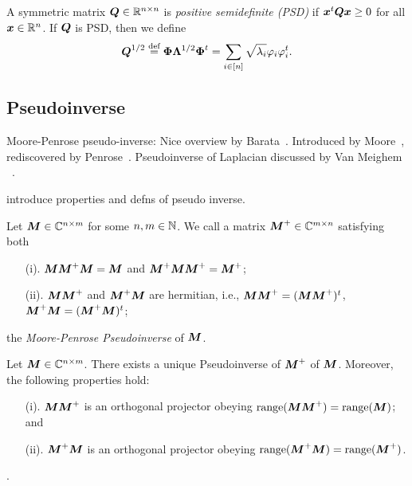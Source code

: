 A symmetric matrix $\vb*{Q}\in\mathbb{R}^{n\times n}$ is \emph{positive semidefinite (PSD)} if $\vb*{x}^t\vb*{{Q}}\vb*{x} \geq 0$ for all $\vb*{x}\in\mathbb{R}^n$. If $\vb*{{Q}}$ is PSD, then we define 
\begin{equation*}
    \vb*{{Q}}^{1/2} \overset{\text{def}}{=} \boldsymbol{\Phi}\vb{\Lambda}^{1/2}\boldsymbol{\Phi}^t = \sum_{i\in[n]}\sqrt{\lambda_i}\varphi_i\varphi_i^t.
\end{equation*}

\subsection{Pseudoinverse}
Moore-Penrose pseudo-inverse: Nice overview by Barata~\cite{barata2012moore}. Introduced by Moore~\cite{moore1920reciprocal}, rediscovered by Penrose~\cite{penrose1955generalized,penrose1956best}. Pseudoinverse of Laplacian discussed by Van Meighem \etal~\cite{van2017pseudoinverse}. 

\TODO introduce properties and defns of pseudo inverse.

\begin{definition}
\label{def:pseudoinverse}
Let ${\vb*{M}}\in\mathbb{C}^{n\times m}$ for some $n,m\in\mathbb{N}$. We call a matrix ${\vb*{M}}^+\in\mathbb{C}^{m\times n}$ satisfying both
\begin{enumerate}
    \item[(i).] ${\vb*{M}}{\vb*{M}}^+{\vb*{M}}={\vb*{M}}$ and ${\vb*{M}}^+{\vb*{M}}{\vb*{M}}^+={\vb*{M}}^+$;
    \item[(ii).] ${\vb*{M}}{\vb*{M}}^+$ and ${\vb*{M}}^+{\vb*{M}}$ are hermitian, i.e., ${\vb*{M}}{\vb*{M}}^+=({\vb*{M}}{\vb*{M}}^+)^t $, ${\vb*{M}}^+{\vb*{M}}=({\vb*{M}}^+{\vb*{M}})^t$; 
\end{enumerate}
the \emph{Moore-Penrose Pseudoinverse} of ${\vb*{M}}$. 
\end{definition}

\begin{lemma}
Let ${\vb*{M}}\in \mathbb{C}^{n\times m}$. There exists a unique Pseudoinverse of ${\vb*{M}}^+$ of ${\vb*{M}}$. Moreover, the following properties hold: 
\begin{enumerate}
    \item[(i).] ${\vb*{M}}{\vb*{M}}^+$ is an orthogonal projector obeying $\textnormal{range}({\vb*{M}}{\vb*{M}}^+)=\textnormal{range}({\vb*{M}})$; and 
    \item[(ii).] ${\vb*{M}}^+{\vb*{M}}$ is an orthogonal projector obeying $\textnormal{range}({\vb*{M}}^+{\vb*{M}})=\textnormal{range}({\vb*{M}}^+)$. 
\end{enumerate}
\end{lemma}

. 

